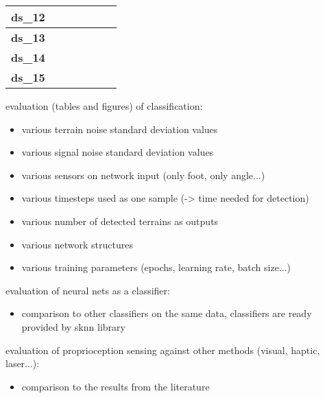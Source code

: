 \begin{table}[H]
{\begin{tabular}{|c|c|c|c|c|c|c|}
\textbf{ds\_12}  &                   &                    &                 &                   &                   &                                \\ \hline
\textbf{ds\_13}  &                   &                    &                 &                   &                   &                                \\ \hline
\textbf{ds\_14}  &                   &                    &                 &                   &                   &                                \\ \hline
\textbf{ds\_15}  &                   &                    &                 &                   &                   &                                \\ \hline
\end{tabular}
}
\end{table}


evaluation (tables and figures) of classification:
\begin{itemize}
\item various terrain noise standard deviation values
\item various signal noise standard deviation values
\item various sensors on network input (only foot, only angle...)
\item various timesteps used as one sample (-> time needed for detection)
\item various number of detected terrains as outputs
\item various network structures
\item various training parameters (epochs, learning rate, batch size...)
\end{itemize}


evaluation of neural nets as a classifier:
\begin{itemize}
\item comparison to other classifiers on the same data, classifiers are ready provided by sknn library
\end{itemize}

evaluation of proprioception sensing against other methods (visual, haptic, laser...):
\begin{itemize}
\item comparison to the results from the literature
\end{itemize}

